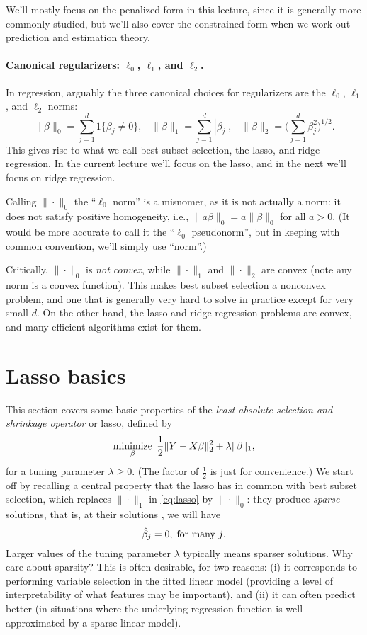 \documentclass{article}
\begin{document}
We'll mostly focus on the penalized form in this lecture, since it is generally
more commonly studied, but we'll also cover the constrained form when we work
out prediction and estimation theory. 

\paragraph{Canonical regularizers: $\ell_0$, $\ell_1$, and $\ell_2$.}

In regression, arguably the three canonical choices for regularizers are the
$\ell_0$, $\ell_1$, and $\ell_2$ norms: 
\[
\|\beta\|_0 = \sum_{j=1}^d 1\{\beta_j \not= 0\}, \;\;\;
\|\beta\|_1 = \sum_{j=1}^d |\beta_j|, \;\;\;
\|\beta\|_2 = \bigg(\sum_{j=1}^d \beta_j^2 \bigg)^{1/2}.
\]
This gives rise to what we call best subset selection, the lasso, and ridge
regression. In the current lecture we'll focus on the lasso, and in the next
we'll focus on ridge regression.

Calling $\|\cdot\|_0$ the ``$\ell_0$ norm'' is a misnomer, as it is not actually
a norm: it does not satisfy positive homogeneity, i.e., $\|a\beta\|_0 =
a\|\beta\|_0$ for all $a>0$. (It would be more accurate to call it the
``$\ell_0$ pseudonorm'', but in keeping with common convention, we'll simply use
``norm''.)     

Critically, $\|\cdot\|_0$ is \emph{not convex}, while $\|\cdot\|_1$ and
$\|\cdot\|_2$ are convex (note any norm is a convex function). This makes best
subset selection a nonconvex problem, and one that is generally very hard to
solve in practice except for very small $d$. On the other hand, the lasso and
ridge regression problems are convex, and many efficient algorithms exist for
them.      

\section{Lasso basics}

This section covers some basic properties of the \emph{least absolute selection
  and shrinkage operator} or lasso, defined by   
\begin{equation}
\label{eq:lasso}
\operatorname*{minimize}_\beta \; \frac{1}{2} \|Y - X\beta\|_2^2 + \lambda \|\beta\|_1, 
\end{equation}
for a tuning parameter $\lambda \geq 0$. (The factor of $\frac{1}{2}$ is just
for convenience.) We start off by recalling a central property that the lasso
has in common with best subset selection, which replaces $\|\cdot\|_1$ in
\eqref{eq:lasso} by  $\|\cdot\|_0$: they produce \emph{sparse} solutions, that
is, at their solutions \smash{$\hbeta$}, we will have   
\[
\hat{\beta}_j = 0, \; \text{for many $j$}.
\]
Larger values of the tuning parameter $\lambda$ typically means sparser
solutions. Why care about sparsity? This is often desirable, for two reasons:
(i) it corresponds to performing variable selection in the fitted linear model
(providing a level of interpretability of what features may be important), and
(ii) it can often predict better (in situations where the underlying regression
function is well-approximated by a sparse linear model).
\end{document}
